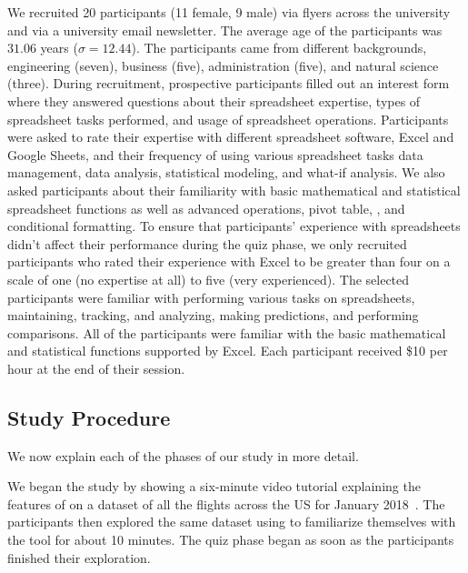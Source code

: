  We recruited 20 participants (11 female, 9 male) via flyers across the university and via a university email newsletter. 
The average age of the participants was $31.06$ years ($\sigma = 12.44$). 
The participants came from different backgrounds, 
\eg engineering (seven), business (five), administration (five), and natural science (three). 
During recruitment, 
prospective participants filled out an interest form
where they answered questions about their spreadsheet expertise, 
types of spreadsheet tasks performed, and usage of spreadsheet operations. 
Participants were asked to rate their expertise with
different spreadsheet software, \eg Excel and Google Sheets, 
and their frequency of using various spreadsheet 
tasks \eg data management, data analysis, statistical modeling, and what-if analysis.
We also asked participants about their familiarity 
with basic mathematical and statistical spreadsheet functions
as well as advanced operations, \eg pivot table,
 , and conditional formatting. 
To ensure that participants’ experience with spreadsheets 
didn’t affect their performance during the quiz phase, 
we only recruited participants who rated their experience 
with Excel to be greater than four on a scale of one (no expertise at all) to five (very experienced). 
The selected participants were familiar with performing 
various tasks on spreadsheets, \eg maintaining, tracking, and
analyzing, making predictions, and performing comparisons. 
All of the participants were familiar with the basic mathematical
and statistical functions supported by Excel. 
Each participant received \$10 per hour at the end of their session.

\subsection{Study Procedure}
\label{sec:procedure}
We now explain each of the phases of our study in more detail.
 
We began the study by showing a six-minute video tutorial explaining the features of \noah on a dataset of all the flights across the US for January 2018~\cite{web:flight}. The participants then explored the same dataset using \noah to familiarize themselves with the tool for about 10 minutes. The quiz phase began as soon as the participants finished their exploration. 


